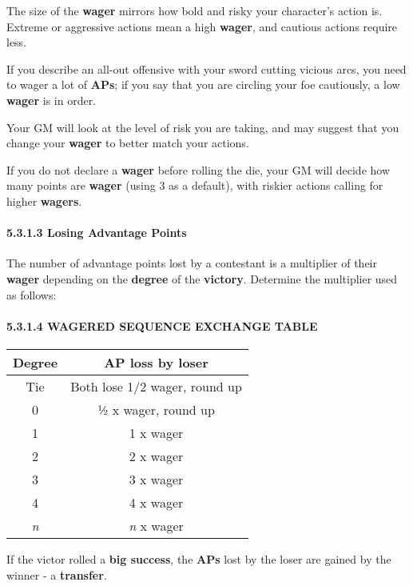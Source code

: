 \documentclass[
  11pt,
]{article}
\begin{document}
The size of the \textbf{wager} mirrors how bold and risky your
character's action is. Extreme or aggressive actions mean a high
\textbf{wager}, and cautious actions require less.

If you describe an all-out offensive with your sword cutting vicious
arcs, you need to wager a lot of \textbf{APs}; if you say that you are
circling your foe cautiously, a low \textbf{wager} is in order.

Your GM will look at the level of risk you are taking, and may suggest
that you change your \textbf{wager} to better match your actions.

If you do not declare a \textbf{wager} before rolling the die, your GM
will decide how many points are \textbf{wager} (using 3 as a default),
with riskier actions calling for higher \textbf{wagers}.

\hypertarget{losing-advantage-points}{%
\paragraph{5.3.1.3 Losing Advantage
Points}\label{losing-advantage-points}}

The number of advantage points lost by a contestant is a multiplier of
their \textbf{wager} depending on the \textbf{degree} of the
\textbf{victory}. Determine the multiplier used as follows:

\hypertarget{wagered-sequence-exchange-table}{%
\paragraph{5.3.1.4 WAGERED SEQUENCE EXCHANGE
TABLE}\label{wagered-sequence-exchange-table}}

\begin{longtable}[]{@{}cc@{}}
\toprule
Degree & AP loss by loser \\
\midrule
\endhead
Tie & Both lose 1/2 wager, round up \\
0 & ½ x wager, round up \\
1 & 1 x wager \\
2 & 2 x wager \\
3 & 3 x wager \\
4 & 4 x wager \\
\emph{n} & \emph{n} x wager \\
\bottomrule
\end{longtable}

If the victor rolled a \textbf{big success}, the \textbf{APs} lost by
the loser are gained by the winner - a \textbf{transfer}.
\end{document}
